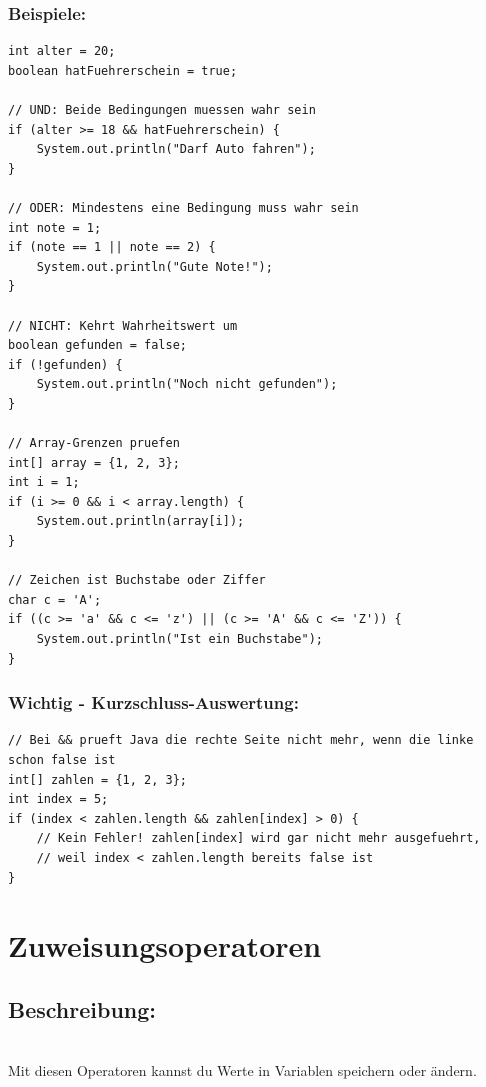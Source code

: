 \subsubsection*{Beispiele:}
\begin{lstlisting}
int alter = 20;
boolean hatFuehrerschein = true;

// UND: Beide Bedingungen muessen wahr sein
if (alter >= 18 && hatFuehrerschein) {
    System.out.println("Darf Auto fahren");
}

// ODER: Mindestens eine Bedingung muss wahr sein
int note = 1;
if (note == 1 || note == 2) {
    System.out.println("Gute Note!");
}

// NICHT: Kehrt Wahrheitswert um
boolean gefunden = false;
if (!gefunden) {
    System.out.println("Noch nicht gefunden");
}

// Array-Grenzen pruefen
int[] array = {1, 2, 3};
int i = 1;
if (i >= 0 && i < array.length) {
    System.out.println(array[i]);
}

// Zeichen ist Buchstabe oder Ziffer
char c = 'A';
if ((c >= 'a' && c <= 'z') || (c >= 'A' && c <= 'Z')) {
    System.out.println("Ist ein Buchstabe");
}
\end{lstlisting}

\subsubsection*{Wichtig - Kurzschluss-Auswertung:}
\begin{lstlisting}
// Bei && prueft Java die rechte Seite nicht mehr, wenn die linke schon false ist
int[] zahlen = {1, 2, 3};
int index = 5;
if (index < zahlen.length && zahlen[index] > 0) {
    // Kein Fehler! zahlen[index] wird gar nicht mehr ausgefuehrt,
    // weil index < zahlen.length bereits false ist
}
\end{lstlisting}

\newpage


\section*{Zuweisungsoperatoren}

\subsection*{Beschreibung:}\\
Mit diesen Operatoren kannst du Werte in Variablen speichern oder ändern.

